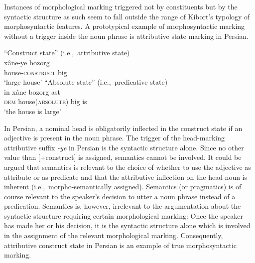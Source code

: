 Instances of morphological marking triggered not by constituents but by the syntactic structure as such seem to fall outside the range of Kibort's typology of morphosyntactic features. A prototypical example of morphosyntactic marking without a trigger inside the noun phrase is attributive state marking in Persian.
\begin{exe}
\ex 
{}
\label{persian state}
\begin{xlist}
\ex 
\rm{“Construct state” (i.e.,~attributive state)}\\
\gll 	xâne-ye bozorg\\
	house-\textsc{construct} big\\
\glt 	‘large house’
\ex 
\rm{“Absolute state” (i.e.,~predicative state)}\\
\gll	in xâne bozorg ast\\
	\textsc{dem} house(\textsc{absolute}) big is\\
\glt	‘the house is large’
\end{xlist}
\end{exe}
In Persian, a nominal head is obligatorily inflected in the construct state if an adjective is present in the noun phrase. The trigger of the head-marking attributive suffix \textit{-ye} in Persian is the syntactic structure alone. Since no other value than [+construct] is assigned, semantics cannot be involved. It could be argued that semantics is relevant to the choice of whether to use the adjective as attribute or as predicate and that the attributive inflection on the head noun is inherent (i.e.,~morpho-semantically assigned). Semantics (or pragmatics) is of course relevant to the speaker's decision to utter a noun phrase instead of a predication. Semantics is, however, irrelevant to the argumentation about the syntactic structure requiring certain morphological marking: Once the speaker has made her or his decision, it is the syntactic structure alone which is involved in the assignment of the relevant morphological marking. Consequently, attributive construct state in Persian is an example of true morphosyntactic marking.

